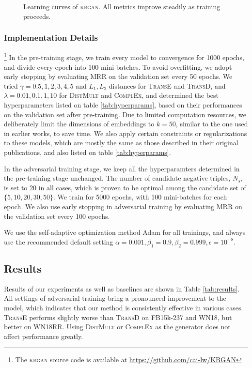 \documentclass[11pt,a4paper]{article}
\begin{document}
\begin{figure}[!t]
\caption{Learning curves of \textsc{kbgan}. All metrics improve steadily as training proceeds.}
\label{fig:curves} 
\end{figure}

\subsubsection{Implementation Details}\footnote{The \textsc{kbgan} source code is available at \url{https://github.com/cai-lw/KBGAN}}
In the pre-training stage, we train every model to convergence for 1000 epochs, and divide every epoch into 100 mini-batches. To avoid overfitting, we adopt early stopping by evaluating MRR on the validation set every 50 epochs. We tried $\gamma=0.5,1,2,3,4,5$ and $L_1, L_2$ distances for \textsc{TransE} and \textsc{TransD}, and $\lambda=0.01,0.1,1,10$ for \textsc{DistMult} and \textsc{ComplEx}, and determined the best hyperparameters listed on table \ref{tab:hyperparams}, based on their performances on the validation set after pre-training. Due to limited computation resources, we deliberately limit the dimensions of embeddings to $k=50$, similar to the one used in earlier works, to save time. We also apply certain constraints or regularizations to these models, which are mostly the same as those described in their original publications, and also listed on table \ref{tab:hyperparams}.

In the adversarial training stage, we keep all the hyperparamters determined in the pre-training stage unchanged. The number of candidate negative triples, $N_s$, is set to 20 in all cases, which is proven to be optimal among the candidate set of $\{5, 10, 20, 30, 50\}$. We train for 5000 epochs, with 100 mini-batches for each epoch. We also use early stopping in adversarial training by evaluating MRR on the validation set every 100 epochs.

We use the self-adaptive optimization method Adam \cite{adam} for all trainings, and always use the recommended default setting $\alpha=0.001, \beta_1=0.9, \beta_2=0.999, \epsilon=10^{-8}$.

\subsection{Results}
Results of our experiments as well as baselines are shown in Table \ref{tab:results}. All settings of adversarial training bring a pronounced improvement to the model, which indicates that our method is consistently effective in various cases. \textsc{TransE} performs slightly worse than \textsc{TransD} on FB15k-237 and WN18, but better on WN18RR. Using \textsc{DistMult} or \textsc{ComplEx} as the generator does not affect performance greatly.
\end{document}
